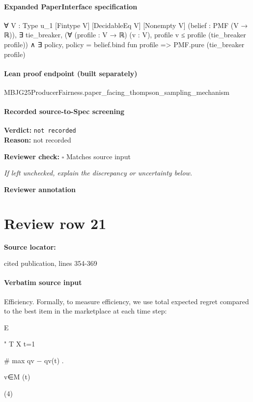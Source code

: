 \documentclass[10pt]{article}
\newcommand{\reviewerbox}{%
  \par\noindent\fbox{\parbox{0.96\linewidth}{\rule{0pt}{0.38in}}}\par
}
\newcommand{\reviewmatch}[1]{%
  \par\noindent\textbf{Reviewer check:} $\square$\; #1\par
  \noindent\emph{If left unchecked, explain the discrepancy or uncertainty below.}\par
}
\begin{document}
\paragraph{Expanded PaperInterface specification}
\begin{ReviewVerbatim}
∀ {V : Type u_1} [Fintype V] [DecidableEq V] [Nonempty V] (belief : PMF (V → ℝ)),
  ∃ tie_breaker,
    (∀ (profile : V → ℝ) (v : V), profile v ≤ profile (tie_breaker profile)) ∧
      ∃ policy, policy = belief.bind fun profile => PMF.pure (tie_breaker profile)
\end{ReviewVerbatim}

\paragraph{Lean proof endpoint (built separately)}\begin{ReviewVerbatim}
MBJG25ProducerFairness.paper_facing_thompson_sampling_mechanism
\end{ReviewVerbatim}

\paragraph{Recorded source-to-Spec screening}
\textbf{Verdict:} \texttt{not recorded}
\\
\textbf{Reason:} not recorded
\reviewmatch{Matches source input}
\noindent\textbf{Reviewer annotation}\par
\reviewerbox
\clearpage
\hypertarget{source-claim-9acd03585d100ede}{}
\section*{Review row 21}
\textbf{Source locator:} {\footnotesize\raggedright cited publication, lines 354-\allowbreak{}369\par}
\paragraph{Verbatim source input}
\begin{ReviewVerbatim}
Efficiency. Formally, to measure efficiency, we use total
expected regret compared to the best item in the marketplace
at each time step:

E

" T
X
t=1

#
max {qv } − qv(t) .

v∈M (t)

(4)
\end{ReviewVerbatim}
\end{document}
